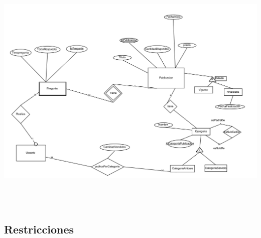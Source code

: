 \documentclass[a4paper, 10pt, twoside]{article}
\begin{document}
\includegraphics[width=19cm, height=12cm]{der5}

\subsection{Restricciones}
\end{document}
